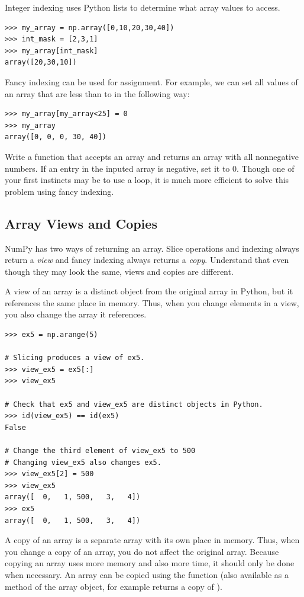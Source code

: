 Integer indexing uses Python lists to determine what array values to access.
\begin{lstlisting}
>>> my_array = np.array([0,10,20,30,40])
>>> int_mask = [2,3,1]
>>> my_array[int_mask]
array([20,30,10])
\end{lstlisting}

Fancy indexing can
be used for assignment. For example, we can set all values of an array
that are less than  to  in the following way:
\begin{lstlisting} 
>>> my_array[my_array<25] = 0
>>> my_array
array([0, 0, 0, 30, 40])
\end{lstlisting}

\begin{problem}
Write a function that accepts an array and returns an array with all nonnegative numbers. If an entry in the inputed array is negative, set it to $0$. Though one of your first instincts may be to use a  loop, it is much more efficient to solve this problem using fancy indexing.
\end{problem}

\subsection*{Array Views and Copies} 
NumPy has two ways of returning an array. Slice operations and indexing always return
a \emph{view} and fancy indexing always returns a \emph{copy}.
Understand that even though they may look the same, views and copies are different.


A view of an array is a distinct object from the original array in Python, but it references the same place in memory. 
Thus, when you change elements in a view, you also change the array it references.
\begin{lstlisting}
>>> ex5 = np.arange(5)

# Slicing produces a view of ex5. 
>>> view_ex5 = ex5[:]
>>> view_ex5

# Check that ex5 and view_ex5 are distinct objects in Python.
>>> id(view_ex5) == id(ex5) 
False

# Change the third element of view_ex5 to 500
# Changing view_ex5 also changes ex5.
>>> view_ex5[2] = 500 
>>> view_ex5
array([  0,   1, 500,   3,   4])
>>> ex5 
array([  0,   1, 500,   3,   4])
\end{lstlisting} 

A copy of an array is a separate array with its own place in memory. 
Thus, when you change a copy of an array, you do not affect the original array. 
Because copying an array uses more memory and also more time, it should only be done when necessary. 
An array can be copied using the  function (also available as a method of 
the array object, for example  returns a copy of ). 

